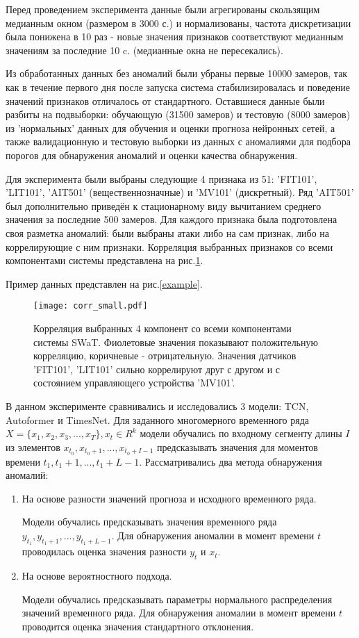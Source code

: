 \documentclass{article}
\begin{document}
Перед проведением эксперимента данные были агрегированы скользящим медианным окном (размером в 3000 с.) и нормализованы, частота дискретизации была понижена в 10 раз - новые значения признаков соответствуют медианным значениям за последние 10 c. (медианные окна не пересекались).

Из обработанных данных без аномалий были убраны первые 10000 замеров, так как в течение первого дня после запуска система стабилизировалась и поведение значений признаков отличалось от стандартного. Оставшиеся данные были разбиты на подвыборки: обучающую (31500 замеров) и тестовую (8000 замеров) из 'нормальных' данных для обучения и оценки прогноза нейронных сетей, а также валидационную и тестовую выборки из данных с аномалиями для подбора порогов для обнаружения аномалий и оценки качества обнаружения.

Для эксперимента были выбраны следующие 4 признака из 51: 'FIT101', 'LIT101', 'AIT501' (вещественнозначные) и 'MV101' (дискретный). Ряд 'AIT501' был дополнительно приведён к стационарному виду вычитанием среднего значения за последние 500 замеров. Для каждого признака была подготовлена своя разметка аномалий: были выбраны атаки либо на сам признак, либо на коррелирующие с ним признаки. Корреляция выбранных признаков со всеми компонентами системы представлена на рис.\ref{corr_small}.

Пример данных представлен на рис.\ref{example}.

\begin{figure}[H]
    	\centering
    \texttt{[image: corr\_small.pdf]}
 	\caption{Корреляция выбранных 4 компонент со всеми компонентами системы SWaT. Фиолетовые значения показывают положительную корреляцию, коричневые - отрицательную. Значения датчиков 'FIT101', 'LIT101' сильно коррелируют друг с другом и с состоянием управляющего устройства 'MV101'.}
 \label{corr_small}
\end{figure}

В данном эксперименте сравнивались и исследовались 3 модели: TCN, Autoformer и TimesNet. Для заданного многомерного временного ряда $X = \{x_1, x_2, x_3, ..., x_T\}, x_t \in R^k$ модели обучались по входному сегменту длины $I$ из элементов $x_{t_0}, x_{t_0 + 1}, ..., x_{t_0 + I - 1}$ предсказывать значения для моментов времени $t_1,t_1 + 1, ..., t_1 + L - 1$. Рассматривались два метода обнаружения аномалий:

\begin{enumerate}
\item На основе разности значений прогноза и исходного временного ряда. 

Модели обучались предсказывать значения временного ряда $y_{t_1}, y_{t_1 + 1}, ..., y_{t_1 + L - 1}$. Для обнаружения аномалии в момент времени $t$ проводилась оценка значения разности $y_t$ и $x_t$.

\item На основе вероятностного подхода.

Модели обучались предсказывать параметры нормального распределения значений временного ряда. Для обнаружения аномалии в момент времени $t$ проводится оценка значения стандартного отклонения.
\end{enumerate}
\end{document}
